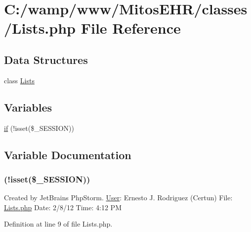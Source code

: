\hypertarget{_lists_8php}{\section{\-C\-:/wamp/www/\-Mitos\-E\-H\-R/classes/\-Lists.php \-File \-Reference}
\label{_lists_8php}
}
\subsection*{\-Data \-Structures}
\begin{DoxyCompactItemize}
\item 
class \hyperlink{class_lists}{\-Lists}
\end{DoxyCompactItemize}
\subsection*{\-Variables}
\begin{DoxyCompactItemize}
\item 
\hyperlink{_lists_8php_a8ceca98aa29914fd2479a84a8d2242fb}{if} (!isset(\$\-\_\-\-S\-E\-S\-S\-I\-O\-N))
\end{DoxyCompactItemize}


\subsection{\-Variable \-Documentation}
\hypertarget{_lists_8php_a8ceca98aa29914fd2479a84a8d2242fb}{
\subsubsection[{if}]{(!isset(\$\-\_\-\-S\-E\-S\-S\-I\-O\-N))}}\label{_lists_8php_a8ceca98aa29914fd2479a84a8d2242fb}
\-Created by \-Jet\-Brains \-Php\-Storm. \hyperlink{class_user}{\-User}\-: \-Ernesto \-J. \-Rodriguez (\-Certun) \-File\-: \hyperlink{_lists_8php}{\-Lists.\-php} \-Date\-: 2/8/12 \-Time\-: 4\-:12 \-P\-M 

\-Definition at line 9 of file \-Lists.\-php.

